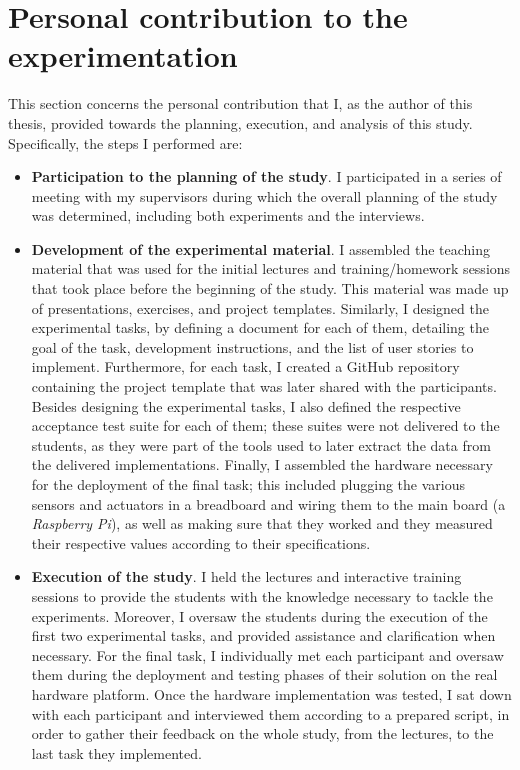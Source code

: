 \section{Personal contribution to the experimentation}
This section concerns the personal contribution that I, as the author of this thesis, provided towards the planning, execution, and analysis of this study.
Specifically, the steps I performed are:

\begin{itemize}
    \item \textbf{Participation to the planning of the study}. I participated in a series of meeting with my supervisors during which the overall planning of the study was determined, including both experiments and the interviews.

    \item \textbf{Development of the experimental material}. I assembled  the teaching material that was used for the initial lectures and training/homework sessions that took place before the beginning of the study. This material was made up of presentations, exercises, and project templates.
    Similarly, I designed the experimental tasks, by defining a document for each of them, detailing the goal of the task, development instructions, and the list of user stories to implement. Furthermore, for each task, I created a GitHub repository containing the project template that was later shared with the participants. Besides designing the experimental tasks, I also defined the respective acceptance test suite for each of them; these suites were not delivered to the students, as they were part of the tools used to later extract the data from the delivered implementations. Finally, I assembled the hardware necessary for the deployment of the final task; this included plugging the various sensors and actuators in a breadboard and wiring them to the main board (a \textit{Raspberry Pi}), as well as making sure that they worked and they measured their respective values according to their specifications.

    \item \textbf{Execution of the study}. 
    I held the lectures and interactive training sessions to provide the students with the knowledge necessary to tackle the experiments. 
    Moreover, I oversaw the students during the execution of the first two experimental tasks, and provided assistance and clarification when necessary. For the final task, I individually met each participant and oversaw them during the deployment and testing phases of their solution on the real hardware platform.
    Once the hardware implementation was tested, I sat down with each participant and interviewed them according to a prepared script, in order to gather their feedback on the whole study, from the lectures, to the last task they implemented.


\end{itemize}
